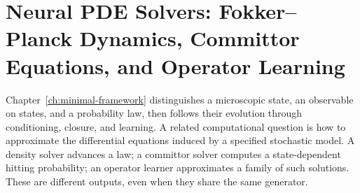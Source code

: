 \documentclass[12pt,a4paper,oneside]{book}
\begin{document}
% 
% 
% 
% 
\clearpage
\chapter{Neural PDE Solvers: Fokker--Planck Dynamics, Committor Equations, and Operator Learning}
\label{ch:neural-pde}
\label{sec:neural-pde}

Chapter~\ref{ch:minimal-framework} distinguishes a microscopic state, an observable on states, and a probability law, then follows
their evolution through conditioning, closure, and learning. A related computational question is how to approximate
the differential equations induced by a specified stochastic model. A density solver advances a law; a committor solver
computes a state-dependent hitting probability; an operator learner approximates a family of such solutions.
These are different outputs, even when they share the same generator.
\end{document}
